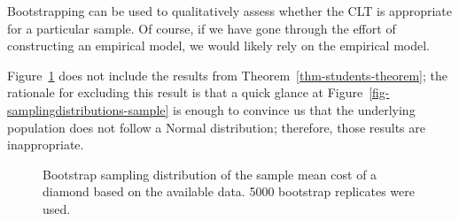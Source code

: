 \documentclass[
  letterpaper,
  DIV=11,
  numbers=noendperiod]{scrreprt}
\theoremstyle{definition}
\theoremstyle{plain}
\theoremstyle{definition}
\theoremstyle{remark}
\begin{document}
\begin{tcolorbox}[enhanced jigsaw, breakable, colframe=quarto-callout-note-color-frame, titlerule=0mm, arc=.35mm, coltitle=black, opacitybacktitle=0.6, leftrule=.75mm, opacityback=0, left=2mm, toprule=.15mm, colbacktitle=quarto-callout-note-color!10!white, title=\textcolor{quarto-callout-note-color}{\faInfo}\hspace{0.5em}{Note}, bottomtitle=1mm, toptitle=1mm, rightrule=.15mm, bottomrule=.15mm, colback=white]

Bootstrapping can be used to qualitatively assess whether the CLT is
appropriate for a particular sample. Of course, if we have gone through
the effort of constructing an empirical model, we would likely rely on
the empirical model.

\end{tcolorbox}

Figure~\ref{fig-samplingdistributions-bootstrap} does not include the
results from Theorem~\ref{thm-students-theorem}; the rationale for
excluding this result is that a quick glance at
Figure~\ref{fig-samplingdistributions-sample} is enough to convince us
that the underlying population does not follow a Normal distribution;
therefore, those results are inappropriate.

\begin{figure}


\caption{\label{fig-samplingdistributions-bootstrap}Bootstrap sampling
distribution of the sample mean cost of a diamond based on the available
data. 5000 bootstrap replicates were used.}

\end{figure}%
\end{document}
